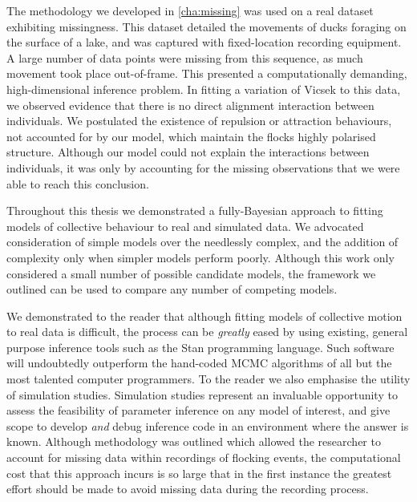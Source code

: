 The methodology we developed in \cref{cha:missing} was used on a real dataset
exhibiting missingness. This dataset detailed the movements of ducks
foraging on the surface of a lake, and was captured with fixed-location
recording equipment. A large number of data points were missing from this
sequence, as much movement took place out-of-frame. This presented a
computationally demanding, high-dimensional inference problem. In fitting a
variation of Vicsek to this data, we observed evidence that there is no direct
alignment interaction between individuals. We postulated the existence of
repulsion or attraction behaviours, not accounted for by our model, which
maintain the flocks highly polarised structure. Although our model could not
explain the interactions between individuals, it was only by accounting for the
missing observations that we were able to reach this conclusion.

Throughout this thesis we demonstrated a fully-Bayesian approach to fitting
models of collective behaviour to real and simulated data. We advocated
consideration of simple models over the needlessly complex, and the addition of
complexity only when simpler models perform poorly. Although this work only
considered a small number of possible candidate models, the framework we
outlined can be used to compare any number of competing models.

We demonstrated to the reader that although fitting models of collective motion
to real data is difficult, the process can be \emph{greatly} eased by using
existing, general purpose inference tools such as the Stan programming
language. Such software will undoubtedly outperform the hand-coded MCMC
algorithms of all but the most talented computer programmers. To the reader we
also emphasise the utility of simulation studies. Simulation studies represent
an invaluable opportunity to assess the feasibility of parameter inference on
any model of interest, and give scope to develop \emph{and} debug inference
code in an environment where the answer is known. Although methodology was
outlined which allowed the researcher to account for missing data within
recordings of flocking events, the computational cost that this approach incurs
is so large that in the first instance the greatest effort should be made to
avoid missing data during the recording process.
